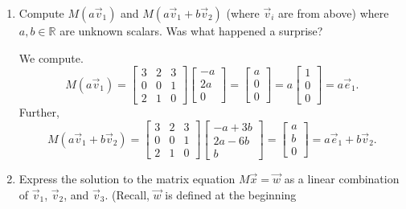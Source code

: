 \documentclass[letter]{article}
\newcommand{\R}{\mathbb{R}}
\newcommand{\mat}[1]{\begin{bmatrix}#1\end{bmatrix}}
\newenvironment{answer}{
	\begin{adjustwidth}{8mm}{} \vspace{2mm}}{\end{adjustwidth} \vspace{2mm}
}
\theoremstyle{plain}
\theoremstyle{definition}
\theoremstyle{remark}
\begin{document}
\begin{enumerate}
\begin{enumerate}
\begin{answer}
\[\begin{array}{ccc|c}
					\end{array}\right] \sim
					\left[\begin{array}{ccc|c}
					1 & 0 & 0 & -1 \\
					0 & 1 & 1 & 2 \\
					0 & 0 & 1 & 0
					\end{array}\right].
					\]
					Thus, we find that 
					\[
					\vec{v}_1 = \mat{-1\\2\\0}.
					\]
					We compute $v_2$ and $v_3$ similarly, and find that
					\[
					\vec{v}_2 = \mat{3\\-6\\1} \text{ and } \vec{v}_3 = \mat{2\\-3\\0}.
					\]
				\end{answer}
				\item Compute $M(a\vec v_1)$ and $M(a\vec v_1+b\vec v_2)$ (where $\vec v_i$ are from above)
					where $a,b\in\R$ are unknown scalars.
					Was what happened a surprise?
				\begin{answer}
					We compute. 
					\[
					M(a\vec{v}_1) = 
					\left[\begin{array}{ccc}
					3 & 2 & 3\\
					0 & 0 & 1\\
					2 & 1 & 0
					\end{array}\right]
					\mat{-a\\2a\\0} = \mat{a\\0\\0} = a\mat{1\\0\\0} = a\vec{e}_1.
					\]
					Further,
					\[
					M(a\vec{v}_1 + b\vec{v}_2) = 
					\left[\begin{array}{ccc}
					3 & 2 & 3\\
					0 & 0 & 1\\
					2 & 1 & 0
					\end{array}\right]
					\mat{-a+3b\\2a-6b\\b} = \mat{a\\b\\0} = a\vec{e}_1 + b\vec{v}_2.
					\]
				\end{answer}
				\item Express the solution to the matrix equation $M\vec x=\vec w$ as a linear combination
					of $\vec v_1$, $\vec v_2$, and $\vec v_3$.  (Recall, $\vec w$ is defined at the beginning

\end{enumerate}
\end{enumerate}
\end{document}
